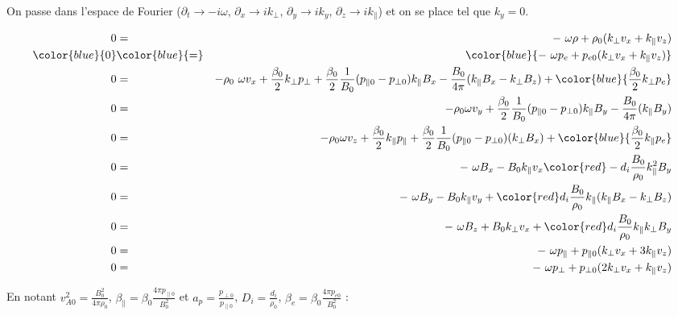 On passe dans l'espace de Fourier ($\partial_t \rightarrow -i \omega$, $\partial_x \rightarrow i k_{\perp} $, $\partial_y \rightarrow i k_y $, $\partial_z \rightarrow i k_{\parallel} $) et on se place tel que $k_y = 0$. 

\begin{eqnarray}
 0 &=&  - \omega \rho + \rho_0 ( k_{\perp} v_x +  k_{\parallel} v_z)  \nonumber\\
   \color{blue}{0} & \color{blue}{=}& \color{blue}{ - \omega  p_{e} + p_{e0} ( k_{\perp} v_x +  k_{\parallel} v_z)} \nonumber \\
 0 &=& - \rho_0 \omega v_x + \frac{\beta_0}{2} k_{\perp} p_{\perp} + \frac{\beta_0}{2} \frac{1}{B_0}(p_{\parallel 0} - p_{\perp 0}) k_{\parallel} B_x - \frac{B_0}{4\pi}(k_{\parallel} B_x -k_{\perp} B_z) + \color{blue}{\frac{\beta_0}{2} k_{\perp} p_{e} } \nonumber\\
 0 &=& - \rho_0 \omega v_y  + \frac{\beta_0}{2} \frac{1}{B_0}(p_{\parallel 0} - p_{\perp 0}) k_{\parallel} B_y - \frac{B_0}{4\pi}(k_{\parallel} B_y ) \nonumber \\
 0 &=& - \rho_0 \omega v_z + \frac{\beta_0}{2} k_{\parallel} p_{\parallel} + \frac{\beta_0}{2}\frac{1}{B_0}(p_{\parallel 0} - p_{\perp 0}) (k_{\perp} B_x ) + \color{blue}{\frac{\beta_0}{2} k_{\parallel} p_{e} }\nonumber\\ 
 0 &=&  - \omega   B_x - B_0 k_{\parallel} v_x  {\color{red} - d_i\frac{B_0 }{\rho_0} k^2_{\parallel} B_y }  \nonumber\\ 
 0 &=& - \omega  B_y - B_0 k_{\parallel} v_y  + {\color{red}d_i\frac{B_0 }{\rho_0} k_{\parallel} (k_{\parallel} B_x - k_{\perp} B_z) } \nonumber\\
 0 &=& - \omega B_z + B_0 k_{\perp} v_x   + {\color{red}d_i \frac{B_0 }{\rho_0}k_{\parallel}  k_{\perp} B_y  } \nonumber \\
 0 &=& - \omega p_{\parallel} + p_{\parallel 0}  (k_{\perp} v_x + 3 k_{\parallel} v_z)\nonumber \\
0 &=& - \omega p_{\perp} + p_{\perp 0} (2k_{\perp} v_x +k_{\parallel} v_z) \nonumber
\end{eqnarray}

En notant $v^2_{A0} = \frac{B^2_0}{4\pi \rho_0}$, $\beta_{\parallel} = \beta_0 \frac{4\pi p_{\parallel 0}}{B^2_0} $ et $a_p = \frac{p_{\perp 0}}{p_{\parallel 0}}$, $D_i = \frac{d_i}{\rho_0}$, $\beta_{e} = \beta_0 \frac{4\pi p_{e 0}}{B^2_0} $ : 
  

